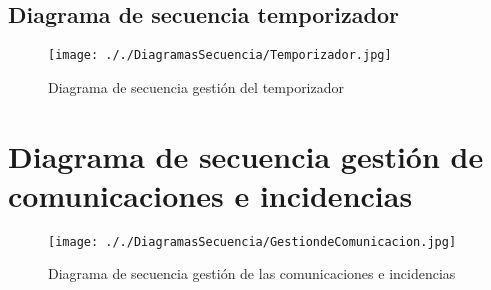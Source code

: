 \documentclass[11pt,spanish]{article} %
\begin{document}
\subsection{Diagrama de secuencia temporizador}
\begin{figure}[H]
	\centering
	\label{GestionTemporizador}
	\texttt{[image: ././DiagramasSecuencia/Temporizador.jpg]}
	\caption{Diagrama de secuencia gestión del temporizador}
\end{figure}

\section{Diagrama de secuencia gestión de comunicaciones e incidencias}
\begin{figure}[H]
	\centering
	\label{GestionComunicacionesIncidencias}
	\texttt{[image: ././DiagramasSecuencia/GestiondeComunicacion.jpg]}
	\caption{Diagrama de secuencia gestión de las comunicaciones e incidencias}
\end{figure}
\end{document}
